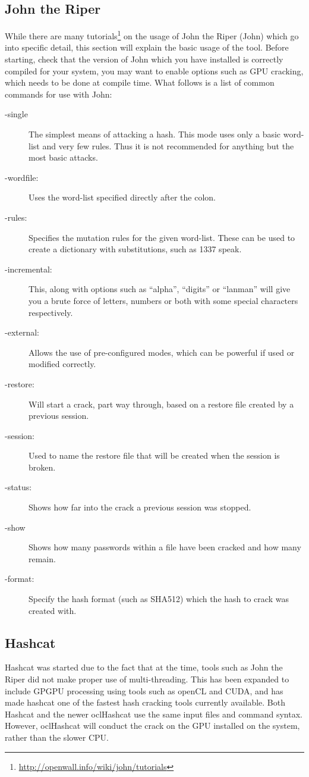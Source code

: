 		\subsection{John the Riper}
			While there are many tutorials\footnote{\url{http://openwall.info/wiki/john/tutorials}} on the usage of John the Riper (John) which go into specific detail, this section will explain the basic usage of the tool.
			Before starting, check that the version of John which you have installed is correctly compiled for your system, you may want to enable options such as GPU cracking, which needs to be done at compile time.
			What follows is a list of common commands for use with John:
			\begin{description}
				\item[-single]
					The simplest means of attacking a hash.
					This mode uses only a basic word-list and very few rules.
					Thus it is not recommended for anything but the most basic attacks.
				\item[-wordfile:]
					Uses the word-list specified directly after the colon.
				\item[-rules:]
					Specifies the mutation rules for the given word-list.
					These can be used to create a dictionary with substitutions, such as 1337 speak.
				\item[-incremental:]
					This, along with options such as ``alpha'', ``digits'' or ``lanman'' will give you a brute force of letters, numbers or both with some special characters respectively.
				\item[-external:]
					Allows the use of pre-configured modes, which can be powerful if used or modified correctly.
				\item[-restore:]
					Will start a crack, part way through, based on a restore file created by a previous session.
				\item[-session:]
					Used to name the restore file that will be created when the session is broken.
				\item[-status:]
					Shows how far into the crack a previous session was stopped.
				\item[-show]
					Shows how many passwords within a file have been cracked and how many remain.
				\item[-format:]
					Specify the hash format (such as SHA512) which the hash to crack was created with.
			\end{description}

		\subsection{Hashcat}
			Hashcat was started due to the fact that at the time, tools such as John the Riper did not make proper use of multi-threading.
			This has been expanded to include GPGPU processing using tools such as openCL and CUDA, and has made hashcat one of the fastest hash cracking tools currently available.
			Both Hashcat and the newer oclHashcat use the same input files and command syntax.
			However, oclHashcat will conduct the crack on the GPU installed on the system, rather than the slower CPU.

